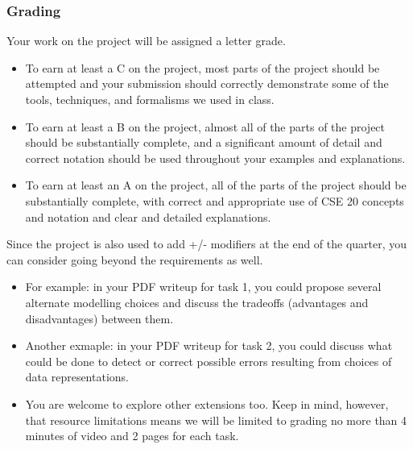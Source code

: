 \documentclass[12pt, oneside]{article}
\begin{document}
\subsubsection*{Grading}
Your work on the project will be assigned a letter grade. 
\begin{itemize}
\item To earn at least a C on the project, most parts of the project should be attempted
and your submission should correctly demonstrate some of the tools, techniques, and formalisms we 
used in class. 
\item To earn at least a B on the project, almost all of the parts of the project should be 
substantially complete, and a significant amount of detail and correct notation should be 
used throughout your examples and explanations.
\item To earn at least an A on the project, all of the parts of the project should be substantially complete,
with correct and appropriate use of CSE 20 concepts and notation and clear and detailed explanations.
\end{itemize}

Since the project is also used to add +/- modifiers at the end of the quarter, you can consider going beyond
the requirements as well.
\begin{itemize}
    \item For example: in your PDF writeup for task 1, you could propose several alternate modelling choices and 
discuss the tradeoffs (advantages and disadvantages) between them. 
    \item Another exmaple: in your PDF writeup for 
task 2, you could discuss what could be done to detect or correct possible errors resulting from choices of
data representations. 
    \item You are welcome to explore other extensions too.  Keep in mind, however, that resource limitations
    means we will be limited to grading no more than 4 minutes of video and 2 pages for each task.
\end{itemize}
\newpage 




\setlength{\evensidemargin}{0in}
\setlength{\oddsidemargin}{0in}
\setlength{\textwidth}{6.6in}
\setlength{\textheight}{8.8in}
\setlength{\topmargin}{0in}
\setlength{\footskip}{0.45in}
\renewcommand{\baselinestretch}{1}
\newlength{\saveparindent}
\setlength{\saveparindent}{\parindent}
\end{document}
